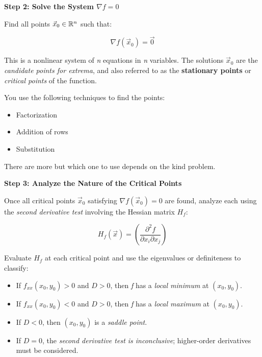 \textbf{Step 2: Solve the System \( \nabla f = 0 \)}

Find all points \( \vec{x}_0 \in \mathbb{R}^n \) such that:

\[
    \nabla f(\vec{x}_0) = \vec{0}
\]

This is a nonlinear system of \emph{n} equations in \emph{n} variables. The solutions \( \vec{x}_0 \) 
are the \emph{candidate points for extrema}, and also referred to as the 
\textbf{stationary points} or \emph{critical points} of the function.
\vspace{\baselineskip}

You use the following techniques to find the points: 

\begin{itemize}

    \item Factorization

    \item Addition of rows

    \item Substitution

\end{itemize}

There are more but which one to use depends on the kind problem.
\vspace{\baselineskip}

\textbf{Step 3: Analyze the Nature of the Critical Points}

Once all critical points \( \vec{x}_0 \) satisfying \( \nabla f(\vec{x}_0) = 0 \) are found, analyze 
each using the \emph{second derivative test} involving the Hessian matrix \( H_f \):

\[
    H_f(\vec{x}) = \left( \frac{\partial^2 f}{\partial x_i \partial x_j} \right)
\]

Evaluate \( H_f \) at each critical point and use the eigenvalues or definiteness to classify:

\begin{itemize}

    \item If \( f_{xx}(x_0, y_0) > 0 \) and \( D > 0 \), then \emph{f} has a \emph{local minimum} at 
          \( (x_0, y_0) \).

    \item If \( f_{xx}(x_0, y_0) < 0 \) and \( D > 0 \), then \emph{f} has a \emph{local maximum} at 
          \( (x_0, y_0) \).

    \item If \( D < 0 \), then \( (x_0, y_0) \) is a \emph{saddle point}.

    \item If \( D = 0 \), the \emph{second derivative test is inconclusive}; higher-order derivatives 
          must be considered.

\end{itemize}

